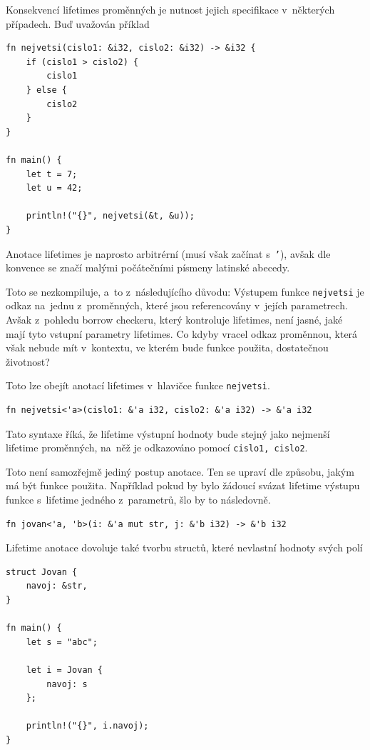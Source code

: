 \documentclass[a4paper, 12pt, twoside]{article} %
\newcommand{\rust}[1]{\texttt{#1}}
\begin{document}
				Konsekvencí lifetimes proměnných je nutnost jejich specifikace v~některých případech. Buď uvažován příklad
				\begin{verbatim}
fn nejvetsi(cislo1: &i32, cislo2: &i32) -> &i32 {
	if (cislo1 > cislo2) {
		cislo1
	} else {
		cislo2
	}
}

fn main() {
	let t = 7;
	let u = 42;
	
	println!("{}", nejvetsi(&t, &u));
}
				\end{verbatim}
			
				Anotace lifetimes je naprosto arbitrérní (musí však začínat s~\rust{'}), avšak dle konvence se značí malými počátečními písmeny latinské abecedy.
				
				Toto se nezkompiluje, a~to z~následujícího důvodu: Výstupem funkce \rust{nejvetsi} je odkaz na~jednu z~proměnných, které jsou referencovány v~jejích parametrech. Avšak z~pohledu borrow checkeru, který kontroluje lifetimes, není jasné, jaké mají tyto vstupní parametry lifetimes. Co kdyby vracel odkaz proměnnou, která však nebude mít v~kontextu, ve kterém bude funkce použita, dostatečnou životnost? 
				
				Toto lze obejít anotací lifetimes v~hlavičce funkce \rust{nejvetsi}.
				\begin{verbatim}
fn nejvetsi<'a>(cislo1: &'a i32, cislo2: &'a i32) -> &'a i32
				\end{verbatim}
			
				Tato syntaxe říká, že lifetime výstupní hodnoty bude stejný jako nejmenší lifetime proměnných, na~něž je odkazováno pomocí \rust{cislo1, cislo2}.
				
				Toto není samozřejmě jediný postup anotace. Ten se upraví dle způsobu, jakým má být funkce použita. Například pokud by bylo žádoucí svázat lifetime výstupu funkce s~lifetime jedného z~parametrů, šlo by to následovně.
				\begin{verbatim}
fn jovan<'a, 'b>(i: &'a mut str, j: &'b i32) -> &'b i32
				\end{verbatim}
			
				Lifetime anotace dovoluje také tvorbu structů, které nevlastní hodnoty svých polí
				\begin{verbatim}
struct Jovan {
	navoj: &str,
}

fn main() {
	let s = "abc";
	
	let i = Jovan {
		navoj: s
	};
	
	println!("{}", i.navoj);
}
				\end{verbatim}
			
\end{document}
